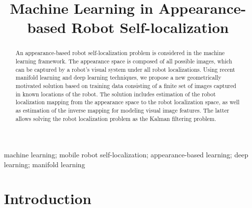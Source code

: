 \documentclass[conference]{IEEEtran} %
\begin{document}
\title{Machine Learning in Appearance-based Robot Self-localization}

\author{

}

%
%

\maketitle              %

\begin{abstract} An appearance-based robot self-localization problem is considered in the machine learning framework. The appearance space is composed of all possible images, which can be captured by a robot's visual system under all robot localizations. Using recent manifold learning and deep learning techniques, we propose a new geometrically motivated solution based on training data consisting of a finite set of images captured in known locations of the robot. The solution includes estimation of the robot localization mapping from the appearance space to the robot localization space, as well as estimation of the inverse mapping for modeling visual image features. The latter allows solving the robot localization problem as the Kalman filtering problem.
\end{abstract}

\begin{IEEEkeywords}
	machine learning; mobile robot self-localization; appearance-based learning; deep learning; manifold learning
\end{IEEEkeywords}
%
\section{Introduction}
\label{sec1}
\end{document}
